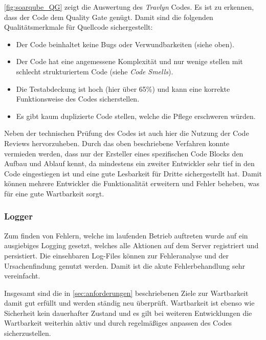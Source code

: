 	\autoref{fig:soarqube_QG} zeigt die Auswertung des \textit{Travlyn} Codes. Es ist zu erkennen, dass der Code dem Quality Gate genügt. Damit sind die folgenden Qualitätsmerkmale für Quellcode sichergestellt:
	
	\begin{itemize}
		\item Der Code beinhaltet keine Bugs oder Verwundbarkeiten (siehe oben).
		\item Der Code hat eine angemessene Komplexität und nur wenige stellen mit schlecht strukturiertem Code (siehe \textit{Code Smells}).
		\item Die Testabdeckung ist hoch (hier über 65\%) und kann eine korrekte Funktionsweise des Codes sicherstellen.
		\item Es gibt kaum duplizierte Code stellen, welche die Pflege erschweren würden. 
	\end{itemize} 
	
	\newpage
	
	Neben der technischen Prüfung des Codes ist auch hier die Nutzung der Code Reviews hervorzuheben. Durch das oben beschriebene Verfahren konnte vermieden werden, dass nur der Ersteller eines spezifischen Code Blocks den Aufbau und Ablauf kennt, da mindestens ein zweiter Entwickler sehr tief in den Code eingestiegen ist und eine gute Lesbarkeit für Dritte sichergestellt hat. Damit können mehrere Entwickler die Funktionalität erweitern und Fehler beheben, was für eine gute Wartbarkeit sorgt.
	
	\subsubsection{Logger}
	Zum finden von Fehlern, welche im laufenden Betrieb auftreten wurde auf ein ausgiebiges Logging gesetzt, welches alle Aktionen auf dem Server registriert und persistiert. Die einsehbaren Log-Files können zur Fehleranalyse und der Ursachenfindung genutzt werden. Damit ist die akute Fehlerbehandlung sehr vereinfacht. 
	
	\vspace{0.25cm}
	
	Insgesamt sind die in \autoref{sec:anforderungen} beschriebenen Ziele zur Wartbarkeit damit gut erfüllt und werden ständig neu überprüft. Wartbarkeit ist ebenso wie Sicherheit kein dauerhafter Zustand und es gilt bei weiteren Entwicklungen die Wartbarkeit weiterhin aktiv und durch regelmäßiges anpassen des Codes sicherzustellen.
	
	
	
